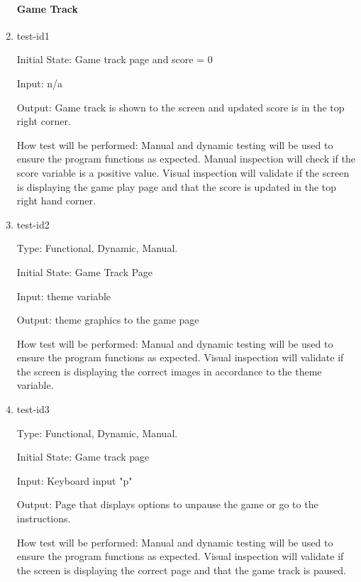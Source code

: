 \documentclass[12pt, titlepage]{article}
\begin{document}
	\begin{enumerate}
		
		\paragraph{Game Track}
		
		\item{test-id1\\}
		
		Initial State: Game track page and score = 0
		
		Input: n/a
		
		Output: Game track is shown to the screen and updated score is in the top right corner. 
		
		How test will be performed: Manual and dynamic testing will be used to ensure the program functions as expected. Manual inspection will check if the score variable is a positive value. Visual inspection will validate if the screen is displaying the game play page and that the score is updated in the top right hand corner. 
		
		\item{test-id2\\}
		
		Type: Functional, Dynamic, Manual.
		
		Initial State: Game Track Page
		
		Input: theme variable
		
		Output: theme graphics to the game page
		
		How test will be performed: Manual and dynamic testing will be used to ensure the program functions as expected. Visual inspection will validate if the screen is displaying the correct images in accordance to the theme variable.   
		
		\item{test-id3\\}
		
		Type: Functional, Dynamic, Manual.
		
		Initial State: Game track page
		
		Input: Keyboard input "p"
		
		Output: Page that displays options to unpause the game or go to the instructions. 
		
		How test will be performed: Manual and dynamic testing will be used to ensure the program functions as expected. Visual inspection will validate if the screen is displaying the correct page and that the game track is paused.
		

\end{enumerate}
\end{document}
